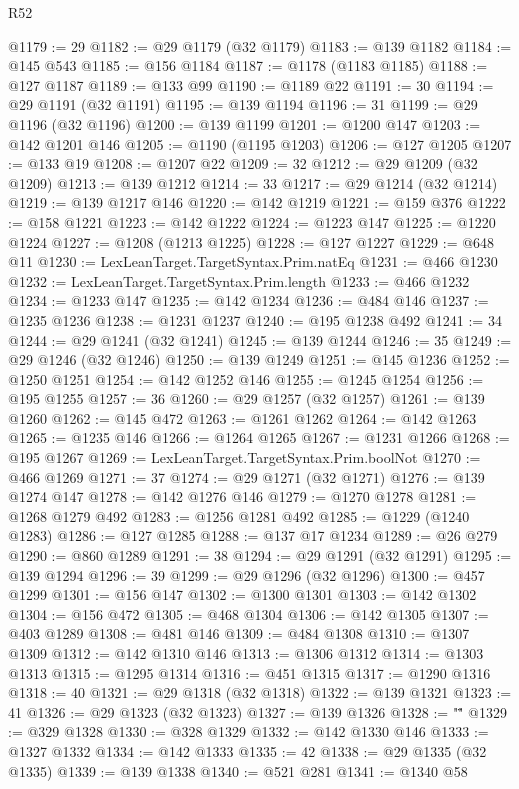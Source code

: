 \begin{lexlean}{R52}
\begin{coremodule}
@1179 := 29
@1182 := @29 @1179 (@32 @1179)
@1183 := @139 @1182
@1184 := @145 @543
@1185 := @156 @1184
@1187 := @1178 (@1183 @1185)
@1188 := @127 @1187
@1189 := @133 @99
@1190 := @1189 @22
@1191 := 30
@1194 := @29 @1191 (@32 @1191)
@1195 := @139 @1194
@1196 := 31
@1199 := @29 @1196 (@32 @1196)
@1200 := @139 @1199
@1201 := @1200 @147
@1203 := @142 @1201 @146
@1205 := @1190 (@1195 @1203)
@1206 := @127 @1205
@1207 := @133 @19
@1208 := @1207 @22
@1209 := 32
@1212 := @29 @1209 (@32 @1209)
@1213 := @139 @1212
@1214 := 33
@1217 := @29 @1214 (@32 @1214)
@1219 := @139 @1217 @146
@1220 := @142 @1219
@1221 := @159 @376
@1222 := @158 @1221
@1223 := @142 @1222
@1224 := @1223 @147
@1225 := @1220 @1224
@1227 := @1208 (@1213 @1225)
@1228 := @127 @1227
@1229 := @648 @11
@1230 := LexLeanTarget.TargetSyntax.Prim.natEq
@1231 := @466 @1230
@1232 := LexLeanTarget.TargetSyntax.Prim.length
@1233 := @466 @1232
@1234 := @1233 @147
@1235 := @142 @1234
@1236 := @484 @146
@1237 := @1235 @1236
@1238 := @1231 @1237
@1240 := @195 @1238 @492
@1241 := 34
@1244 := @29 @1241 (@32 @1241)
@1245 := @139 @1244
@1246 := 35
@1249 := @29 @1246 (@32 @1246)
@1250 := @139 @1249
@1251 := @145 @1236
@1252 := @1250 @1251
@1254 := @142 @1252 @146
@1255 := @1245 @1254
@1256 := @195 @1255
@1257 := 36
@1260 := @29 @1257 (@32 @1257)
@1261 := @139 @1260
@1262 := @145 @472
@1263 := @1261 @1262
@1264 := @142 @1263
@1265 := @1235 @146
@1266 := @1264 @1265
@1267 := @1231 @1266
@1268 := @195 @1267
@1269 := LexLeanTarget.TargetSyntax.Prim.boolNot
@1270 := @466 @1269
@1271 := 37
@1274 := @29 @1271 (@32 @1271)
@1276 := @139 @1274 @147
@1278 := @142 @1276 @146
@1279 := @1270 @1278
@1281 := @1268 @1279 @492
@1283 := @1256 @1281 @492
@1285 := @1229 (@1240 @1283)
@1286 := @127 @1285
@1288 := @137 @17 @1234
@1289 := @26 @279
@1290 := @860 @1289
@1291 := 38
@1294 := @29 @1291 (@32 @1291)
@1295 := @139 @1294
@1296 := 39
@1299 := @29 @1296 (@32 @1296)
@1300 := @457 @1299
@1301 := @156 @147
@1302 := @1300 @1301
@1303 := @142 @1302
@1304 := @156 @472
@1305 := @468 @1304
@1306 := @142 @1305
@1307 := @403 @1289
@1308 := @481 @146
@1309 := @484 @1308
@1310 := @1307 @1309
@1312 := @142 @1310 @146
@1313 := @1306 @1312
@1314 := @1303 @1313
@1315 := @1295 @1314
@1316 := @451 @1315
@1317 := @1290 @1316
@1318 := 40
@1321 := @29 @1318 (@32 @1318)
@1322 := @139 @1321
@1323 := 41
@1326 := @29 @1323 (@32 @1323)
@1327 := @139 @1326
@1328 := "\""
@1329 := @329 @1328
@1330 := @328 @1329
@1332 := @142 @1330 @146
@1333 := @1327 @1332
@1334 := @142 @1333
@1335 := 42
@1338 := @29 @1335 (@32 @1335)
@1339 := @139 @1338
@1340 := @521 @281
@1341 := @1340 @58

\end{coremodule}
\end{lexlean}
